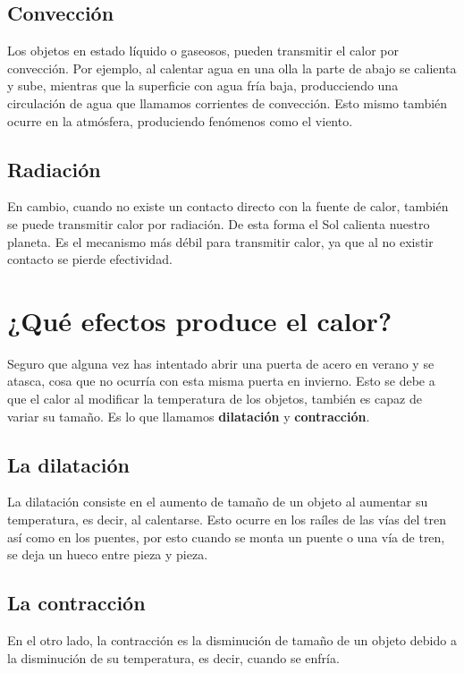 \subsection{Convección}

Los objetos en estado líquido o gaseosos, pueden transmitir el calor por convección. Por ejemplo, al calentar agua en una olla la parte de abajo se calienta y sube, mientras que la superficie con agua fría baja, producciendo una circulación de agua que llamamos corrientes de convección. Esto mismo también ocurre en la atmósfera, produciendo fenómenos como el viento.


\subsection{Radiación}

En cambio, cuando no existe un contacto directo con la fuente de calor, también se puede transmitir calor por radiación. De esta forma el Sol calienta nuestro planeta. Es el mecanismo más débil para transmitir calor, ya que al no existir contacto se pierde efectividad.



\section{¿Qué efectos produce el calor?}

Seguro que alguna vez has intentado abrir una puerta de acero en verano y se atasca, cosa que no ocurría con esta misma puerta en invierno. Esto se debe a que el calor al modificar la temperatura de los objetos, también es capaz de variar su tamaño. Es lo que llamamos \textbf{dilatación} y \textbf{contracción}.

\subsection{La dilatación}

La dilatación consiste en el aumento de tamaño de un objeto al aumentar su temperatura, es decir, al calentarse. Esto ocurre en los raíles de las vías del tren así como en los puentes, por esto cuando se monta un puente o una vía de tren, se deja un hueco entre pieza y pieza. 

\subsection{La contracción}

En el otro lado, la contracción es la disminución de tamaño de un objeto debido a la disminución de su temperatura, es decir, cuando se enfría. 



